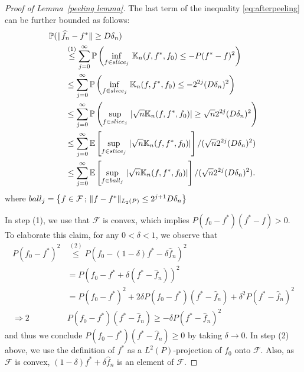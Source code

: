 \documentclass[12pt]{article}
\begin{document}
\begin{appendices}
\begin{proof}[Proof of Lemma~\ref{peeling lemma}]
The last term of the inequality \eqref{eq:afterpeeling} can be further bounded as follows:
\begin{equation}\label{eq:useMineq}
    \begin{aligned}
     &\mathbb{P}(\|\widehat f_n - f^*\|\geq D\delta_n)\\
    &\qquad \stackrel{(1)}{\leq} \sum_{j=0}^{\infty} \mathbb{P}\left(\inf_{f\in {\rm slice}_j}\,\mathbb{K}_n(f,f^*,f_0) \leq - P(f^* - f)^2\right)\\
    &\qquad  \leq  \sum_{j=0}^{\infty} \mathbb{P}\left(\inf_{f\in {\rm slice}_j}\,\mathbb{K}_n(f,f^*,f_0) \leq -2^{2j}(D\delta_n)^2 \right)\\
    &\qquad  \leq \sum_{j=0}^{\infty} \mathbb{P}\left(\sup_{f\in {\rm slice}_j}\,|\sqrt{n}\mathbb{K}_n(f,f^*,f_0)| \geq \sqrt{n}2^{2j}(D\delta_n)^2 \right)\\
    & \qquad \leq \sum_{j=0}^{\infty} \mathbb{E}\left[\sup_{f\in {\rm slice}_j}\,|\sqrt{n}\mathbb{K}_n(f,f^*,f_0)|\right]/(\sqrt{n}2^{2j}(D\delta_n)^2)\\
    &\qquad  \leq \sum_{j=0}^{\infty} \mathbb{E}\left[\sup_{ f\in {\rm ball}_j}\, |\sqrt{n}\mathbb{K}_n(f,f^*,f_0)|\right]/(\sqrt{n}2^{2j}(D\delta_n)^2).
    \end{aligned}
\end{equation}
where ${\rm ball}_j = \left\{f \in \mathcal{F}\, ;\, \|f-f^*\|_{L_2(P)} \leq 2^{j+1}D\delta_n\right\}$

In step (1), we use that $\mathcal{F}$ is convex, which implies $P(f_0 - f^*)(f^* - f)>0$. To elaborate this claim, for any $0 < \delta < 1$, we observe that 
\begin{align*}
    P(f_0-f^*)^2 
    &\stackrel{(2)}{\leq} P(f_0-(1-\delta)f^*-\delta\widehat{f}_{n})^2\\
    &=P(f_0-f^*+\delta(f^*-\widehat{f}_{n}))^2 \\
    &=P(f_0-f^*)^2+2\delta P(f_0-f^*)(f^*-\widehat{f}_{n}) + \delta^2 P(f^*-\widehat{f}_{n})^2\\
    \Longrightarrow 2 &P(f_0-f^*)(f^*-\widehat{f}_{n}) \geq -\delta P(f^*-\widehat{f}_{n})^2
\end{align*}
and thus we conclude $P(f_0-f^*)(f^*-\widehat{f}_{n})\geq 0$ by taking $\delta \rightarrow 0$. In step (2) above, we use the definition of $f^*$ as a $L^2(P)$-projection of $f_0$ onto $\mathcal{F}$. Also, as $\mathcal{F}$ is convex, $(1-\delta)f^* + \delta\widehat{f}_{n}$ is an element of $\mathcal{F}$. 


\end{proof}
\end{appendices}
\end{document}
